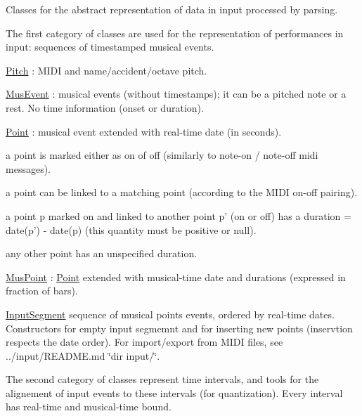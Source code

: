 Classes for the abstract representation of data in input processed by parsing.

The first category of classes are used for the representation of performances in input\+: sequences of timestamped musical events.


\begin{DoxyItemize}
\item {\ttfamily \mbox{\hyperlink{classPitch}{Pitch}}} \+: M\+I\+DI and name/accident/octave pitch.
\item {\ttfamily \mbox{\hyperlink{classMusEvent}{Mus\+Event}}} \+: musical events (without timestamps); it can be a pitched note or a rest. No time information (onset or duration).
\item {\ttfamily \mbox{\hyperlink{classPoint}{Point}}} \+: musical event extended with real-\/time date (in seconds).
\begin{DoxyItemize}
\item a point is marked either as {\ttfamily on} of {\ttfamily off} (similarly to note-\/on / note-\/off midi messages).
\item a point can be linked to a matching point (according to the M\+I\+DI on-\/off pairing).
\item a point {\ttfamily p} marked {\ttfamily on} and linked to another point {\ttfamily p’} ({\ttfamily on} or {\ttfamily off}) has a duration = {\ttfamily date(p’) -\/ date(p)} (this quantity must be positive or null).
\item any other point has an unspecified duration.
\end{DoxyItemize}
\item {\ttfamily \mbox{\hyperlink{classMusPoint}{Mus\+Point}}} \+: \mbox{\hyperlink{classPoint}{Point}} extended with musical-\/time date and durations (expressed in fraction of bars).
\item {\ttfamily \mbox{\hyperlink{classInputSegment}{Input\+Segment}}} sequence of musical points events, ordered by real-\/time dates. Constructors for empty input segmemnt and for inserting new points (inservtion respects the date order). For import/export from M\+I\+DI files, see ../input/\+R\+E\+A\+D\+ME.md \char`\"{}dir input/\char`\"{}.
\end{DoxyItemize}

The second category of classes represent time intervals, and tools for the alignement of input events to these intervals (for quantization). Every interval has real-\/time and musical-\/time bound.


